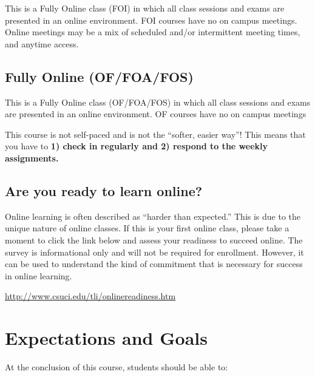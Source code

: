 \documentclass[11pt,]{article}
\begin{document}
This is a Fully Online class (FOI) in which all class sessions and exams
are presented in an online environment. FOI courses have no on campus
meetings. Online meetings may be a mix of scheduled and/or intermittent
meeting times, and anytime access.

\hypertarget{fully-online-offoafos}{%
\subsection{Fully Online (OF/FOA/FOS)}\label{fully-online-offoafos}}

This is a Fully Online class (OF/FOA/FOS) in which all class sessions
and exams are presented in an online environment. OF courses have no on
campus meetings

This course is not self-paced and is not the ``softer, easier way''!
This means that you have to \textbf{1) check in regularly and 2) respond
to the weekly assignments.}

\hypertarget{are-you-ready-to-learn-online}{%
\subsection{Are you ready to learn
online?}\label{are-you-ready-to-learn-online}}

Online learning is often described as ``harder than expected.'' This is
due to the unique nature of online classes. If this is your first online
class, please take a moment to click the link below and assess your
readiness to succeed online. The survey is informational only and will
not be required for enrollment. However, it can be used to understand
the kind of commitment that is necessary for success in online learning.

\url{http://www.csuci.edu/tli/onlinereadiness.htm}

\hypertarget{expectations-and-goals}{%
\section{Expectations and Goals}\label{expectations-and-goals}}

At the conclusion of this course, students should be able to:
\end{document}
